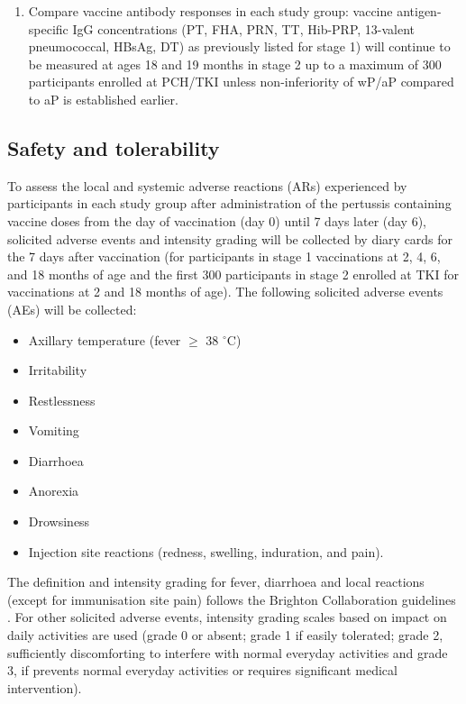 \documentclass{bmcart}
\begin{document}
\begin{enumerate}[resume]
	\item Compare vaccine antibody responses in each study group:
	vaccine antigen-specific IgG concentrations (PT, FHA, PRN, TT, Hib-PRP, 13-valent pneumococcal, HBsAg, DT) 
	as previously listed for stage 1) will continue to be measured at ages 18 and 19 months in stage 2 up to a 
	maximum of 300 participants enrolled at PCH/TKI unless non-inferiority of wP/aP compared to aP is established earlier.
\end{enumerate}

\subsection*{Safety and tolerability}

To assess the local and systemic adverse reactions (ARs) experienced by participants in each study group after administration of the pertussis containing vaccine doses from the day of vaccination (day 0) until 7 days later (day 6), solicited adverse events and intensity grading will be collected by diary cards for the 7 days after vaccination (for participants in stage 1 vaccinations at 2, 4, 6, and 18 months of age and the first 300 participants in stage 2 enrolled at TKI for vaccinations at 2 and 18 months of age). The following solicited adverse events (AEs) will be collected:
 \begin{itemize}
     \item Axillary temperature (fever $\geq$ 38 $^\circ$C)
     \item Irritability
     \item Restlessness
     \item Vomiting
     \item Diarrhoea
     \item Anorexia
     \item Drowsiness
     \item Injection site reactions (redness, swelling, induration, and pain).
 \end{itemize}
 The definition and intensity grading for fever, diarrhoea and  local  reactions  (except  for  immunisation  site  pain)  follows  the  Brighton  Collaboration  guidelines \cite{Marcy2004, Gidudu2011, Gidudu2008, Kohl2007a, Kohl2007b}. 
 For other solicited adverse events, intensity grading scales based on impact on daily activities are used  (grade 0 or absent; grade 1 if easily tolerated; grade 2, sufficiently discomforting to interfere with normal everyday activities and grade 3, if prevents normal everyday activities or requires significant medical intervention).
\end{document}
